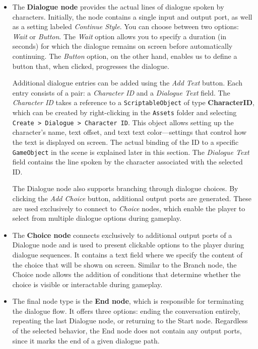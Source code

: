 \begin{itemize}
    \item The \textbf{Dialogue node} provides the actual lines of dialogue spoken by characters. Initially, the node contains a single input and output port, as well as a setting labeled \textit{Continue Style}. You can choose between two options: \textit{Wait} or \textit{Button}. The \textit{Wait} option allows you to specify a duration (in seconds) for which the dialogue remains on screen before automatically continuing. The \textit{Button} option, on the other hand, enables us to define a button that, when clicked, progresses the dialogue.

Additional dialogue entries can be added using the \textit{Add Text} button. Each entry consists of a pair: a \textit{Character ID} and a \textit{Dialogue Text} field. The \textit{Character ID} takes a reference to a \verb|ScriptableObject| of type \textbf{CharacterID}, which can be created by right-clicking in the \verb|Assets| folder and selecting \verb|Create > Dialogue > Character ID|. This object allows setting up the character's name, text offset, and text text color—settings that control how the text is displayed on screen. The actual binding of the ID to a specific \verb|GameObject| in the scene is explained later in this section. The \textit{Dialogue Text} field contains the line spoken by the character associated with the selected ID.

The Dialogue node also supports branching through dialogue choices. By clicking the \textit{Add Choice} button, additional output ports are generated. These are used exclusively to connect to \textit{Choice} nodes, which enable the player to select from multiple dialogue options during gameplay.

    \item The \textbf{Choice node} connects exclusively to additional output ports of a Dialogue node and is used to present clickable options to the player during dialogue sequences. It contains a text field where we specify the content of the choice that will be shown on screen. Similar to the Branch node, the Choice node allows the addition of conditions that determine whether the choice is visible or interactable during gameplay. 
    \item  The final node type is the \textbf{End node}, which is responsible for terminating the dialogue flow. It offers three options: ending the conversation entirely, repeating the last Dialogue node, or returning to the Start node. Regardless of the selected behavior, the End node does not contain any output ports, since it marks the end of a given dialogue path. 
\end{itemize}
